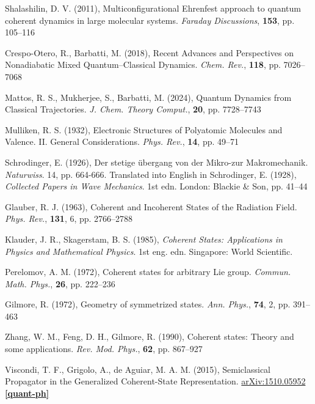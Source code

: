 \documentclass[12pt]{report}
\begin{document}
	\begin{thebibliography}{10}

	
	Shalashilin, D. V. (2011), Multiconfigurational Ehrenfest approach to quantum coherent dynamics in large molecular systems. \textit{Faraday Discussions}, \textbf{153}, pp. 105--116
	
	Crespo-Otero, R., Barbatti, M. (2018), Recent Advances and Perspectives on Nonadiabatic Mixed Quantum–Classical Dynamics. \textit{Chem. Rev.}, \textbf{118}, pp. 7026--7068
	
	Mattos, R. S., Mukherjee, S., Barbatti, M. (2024), Quantum Dynamics from Classical Trajectories. \textit{J. Chem. Theory Comput.}, \textbf{20}, pp. 7728--7743
	
	Mulliken, R. S. (1932), Electronic Structures of Polyatomic Molecules and Valence. II. General Considerations. \textit{Phys. Rev.}, \textbf{14}, pp. 49--71
	
	Schrodinger, E. (1926), Der stetige übergang von der Mikro-zur Makromechanik. \textit{Naturwiss}. 14, pp. 664-666. Translated into English in Schrodinger, E. (1928), \textit{Collected Papers in Wave Mechanics}. 1st edn. London: Blackie \& Son, pp. 41--44
	
	Glauber, R. J. (1963), Coherent and Incoherent States of the Radiation Field. \textit{Phys. Rev.}, \textbf{131}, 6, pp. 2766--2788
	
	Klauder, J. R., Skagerstam, B. S. (1985), \textit{Coherent States: Applications in Physics and Mathematical Physics}. 1st eng. edn. Singapore: World Scientific.
	
	Perelomov, A. M. (1972), Coherent states for arbitrary Lie group. \textit{Commun. Math. Phys.}, \textbf{26}, pp. 222--236
	
	Gilmore, R. (1972), Geometry of symmetrized states. \textit{Ann. Phys.}, \textbf{74}, 2, pp. 391--463
	
	Zhang, W. M., Feng, D. H., Gilmore, R. (1990), Coherent states: Theory and some applications. \textit{Rev. Mod. Phys.}, \textbf{62}, pp. 867--927
	
	Viscondi, T. F., Grigolo, A., de Aguiar, M. A. M. (2015), Semiclassical Propagator in the Generalized Coherent-State Representation. \href{https://doi.org/10.48550/arXiv.1510.05952}{arXiv:1510.05952 \textbf{[quant-ph]}}
	

\end{thebibliography}
\end{document}
